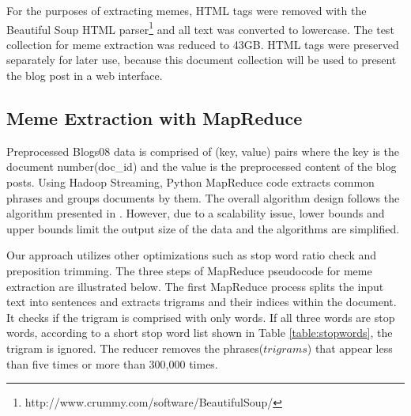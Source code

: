 \documentclass{sig-alternate}
\begin{document}
For the purposes of extracting memes, HTML tags were removed with the Beautiful Soup HTML parser\footnote{http://www.crummy.com/software/BeautifulSoup/} and all text was converted to lowercase. The test collection for meme extraction was reduced to 43GB. HTML tags were preserved separately for later use, because this document collection will be used to present the blog post in a web interface.

\subsection{Meme Extraction with MapReduce}

Preprocessed Blogs08 data is comprised of (key, value) pairs where the key is the document number(doc\_id) and the value is the preprocessed content of the blog posts. Using Hadoop Streaming, Python MapReduce code extracts common phrases and groups documents by them. The overall algorithm design follows the algorithm presented in \cite{Kolak2008}. However, due to a scalability issue, lower bounds and upper bounds limit the output size of the data and the algorithms are simplified.

Our approach utilizes other optimizations such as stop word ratio check and preposition trimming. The three steps of MapReduce pseudocode for meme extraction are illustrated below. The first MapReduce process splits the input text into sentences and extracts trigrams and their indices within the document. It checks if the trigram is comprised with only words. If all three words are stop words, according to a short stop word list shown in Table \ref{table:stopwords}, the trigram is ignored. The reducer removes the phrases($trigrams$) that appear less than five times or more than 300,000 times.
\end{document}
